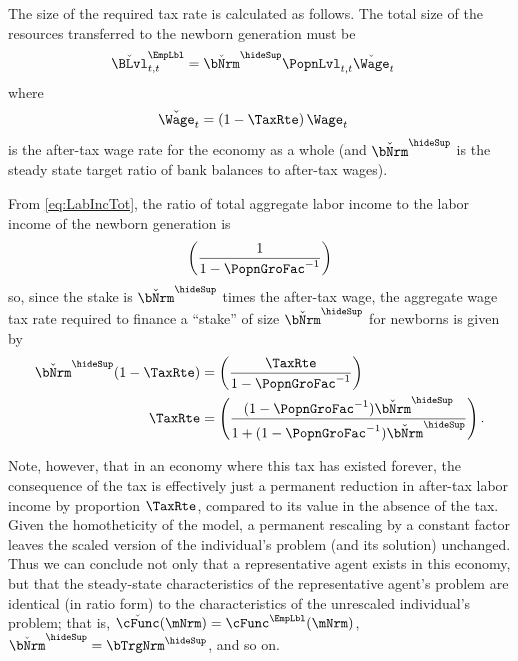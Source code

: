 \documentclass{econark}
\begin{document}
The size of the required tax rate is calculated as follows.  The total size
of the resources transferred to the newborn generation must be
\begin{equation}\begin{gathered}\begin{aligned}
  \check{\BLvl}^{\EmpLbl}_{t,t} & =  \check{\bNrm}^{\hideSup} \PopnLvl_{t,t} \check{\Wage}_{t}
\end{aligned}\end{gathered}\end{equation}
where
\begin{equation}\begin{gathered}\begin{aligned}
  \check{\Wage}_{t} & =  \left(1-\TaxRte\right)\Wage_{t}
\end{aligned}\end{gathered}\end{equation}
is the after-tax wage rate for the economy as a whole (and $\check{\bNrm}^{\hideSup}$ is the steady state target ratio of bank balances to after-tax wages).

From \eqref{eq:LabIncTot}, the ratio of total aggregate labor income 
to the labor income of the newborn generation is 
\begin{equation}\begin{gathered}\begin{aligned}
  \left(\frac{1}{1-\PopnGroFac^{-1}}\right)
\end{aligned}\end{gathered}\end{equation}
so, since the stake is $\check{\bNrm}^{\hideSup}$ times the after-tax wage, the aggregate wage tax rate required to finance a ``stake'' of size $\check{\bNrm}^{\hideSup}$ for
newborns is given by 
\begin{equation}\begin{gathered}\begin{aligned}
  \check{\bNrm}^{\hideSup}(1-\TaxRte) & =    \left(\frac{\TaxRte}{1-\PopnGroFac^{-1}}\right)
\\ \TaxRte & =  \left(\frac{(1-\PopnGroFac^{-1})\check{\bNrm}^{\hideSup}}{1+(1-\PopnGroFac^{-1})\check{\bNrm}^{\hideSup}}\right)
.
\end{aligned}\end{gathered}\end{equation}

Note, however, that in an economy where this tax has existed forever, the consequence
of the tax is effectively just a permanent reduction in after-tax labor income by proportion $\TaxRte$, compared to its value in the absence of the tax.  
Given the homotheticity of the model, a permanent rescaling by a constant 
factor leaves the scaled version of the individual's problem (and its solution)
unchanged.  Thus we can conclude not only that a representative agent exists
in this economy, but that the steady-state characteristics of the 
representative agent's problem are identical (in ratio form) to the 
characteristics of the unrescaled individual's problem; that is, 
$\check{\cFunc}(\mNrm) = \cFunc^{\EmpLbl}(\mNrm)$, $\check{\bNrm}^{\hideSup} = \bTrgNrm^{\hideSup}$, and so on.  
\end{document}
